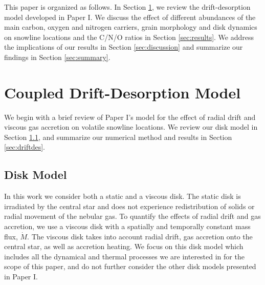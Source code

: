 \documentclass[apj]{emulateapj}
\newcommand{\emgr}[1]{\emph{ \color{gray} #1}}
\begin{document}
This paper is organized as follows. In Section \ref{sec:review}, we review the drift-desorption model developed in Paper I. We discuss the effect of different abundances of the main carbon, oxygen and nitrogen carriers, grain morphology and disk dynamics on snowline locations and the C/N/O ratios in Section \ref{sec:results}. We address the implications of our results in Section \ref{sec:discussion} and summarize our findings in Section \ref{sec:summary}.  




\section{Coupled Drift-Desorption Model}
\label{sec:review}

We begin with a brief review of Paper I's model for the effect of radial drift and viscous gas accretion on volatile snowline locations. We review our disk model in Section \ref{sec:disktime}, and summarize our numerical method and results in Section \ref{sec:driftdes}.

\subsection{Disk Model}
\label{sec:disktime}

In this work we consider both a static and a viscous disk. The static disk is irradiated by the central star and does not experience redistribution of solids or radial movement of the nebular gas. To quantify the effects of radial drift and gas accretion, we use a viscous disk with a spatially and temporally constant mass flux, $\dot{M}$. The viscous disk takes into account radial drift, gas accretion onto the central star, as well as accretion heating. We focus on this disk model which includes all the dynamical and thermal processes we are interested in for the scope of this paper, and do not further consider the other disk models presented in Paper I.  
\end{document}
